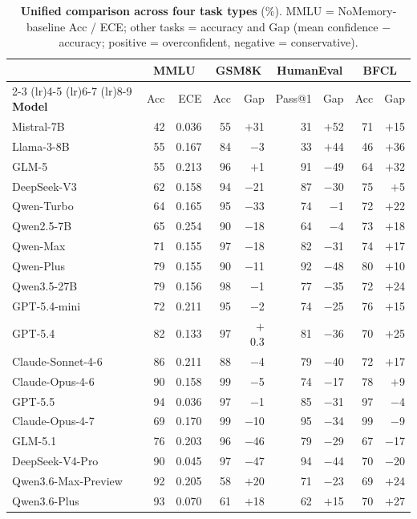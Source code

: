 \documentclass[11pt]{article}
\begin{document}
\begin{table}[h]
\centering
\caption{\textbf{Unified comparison across four task types} (\%). MMLU = NoMemory-baseline Acc / ECE; other tasks = accuracy and Gap (mean confidence $-$ accuracy; positive = overconfident, negative = conservative).}
\label{tab:fourtask_overview}
\small
\setlength{\tabcolsep}{4pt}
\begin{tabular}{l rr rr rr rr}
\toprule
& \multicolumn{2}{c}{\textbf{MMLU}} & \multicolumn{2}{c}{\textbf{GSM8K}} & \multicolumn{2}{c}{\textbf{HumanEval}} & \multicolumn{2}{c}{\textbf{BFCL}} \\
\cmidrule(lr){2-3} \cmidrule(lr){4-5} \cmidrule(lr){6-7} \cmidrule(lr){8-9}
\textbf{Model} & Acc & ECE & Acc & Gap & Pass@1 & Gap & Acc & Gap \\
\midrule
Mistral-7B        & 42 & 0.036 & 55 & $+$31 & 31 & $+$52 & 71 & $+$15 \\
Llama-3-8B        & 55 & 0.167 & 84 & $-$3  & 33 & $+$44 & 46 & $+$36 \\
GLM-5             & 55 & 0.213 & 96 & $+$1  & 91 & $-$49 & 64 & $+$32 \\
DeepSeek-V3     & 62 & 0.158 & 94 & $-$21 & 87 & $-$30 & 75 & $+$5  \\
Qwen-Turbo        & 64 & 0.165 & 95 & $-$33 & 74 & $-$1  & 72 & $+$22 \\
Qwen2.5-7B        & 65 & 0.254 & 90 & $-$18 & 64 & $-$4  & 73 & $+$18 \\
Qwen-Max          & 71 & 0.155 & 97 & $-$18 & 82 & $-$31 & 74 & $+$17 \\
Qwen-Plus         & 79 & 0.155 & 90 & $-$11 & 92 & $-$48 & 80 & $+$10 \\
Qwen3.5-27B       & 79 & 0.156 & 98 & $-$1  & 77 & $-$35 & 72 & $+$24 \\
\midrule
GPT-5.4-mini      & 72 & 0.211 & 95 & $-$2  & 74 & $-$25 & 76 & $+$15 \\
GPT-5.4           & 82 & 0.133 & 97 & $+$0.3 & 81 & $-$36 & 70 & $+$25 \\
Claude-Sonnet-4-6 & 86 & 0.211 & 88 & $-$4  & 79 & $-$40 & 72 & $+$17 \\
Claude-Opus-4-6   & 90 & 0.158 & 99 & $-$5  & 74 & $-$17 & 78 & $+$9  \\
GPT-5.5           & 94 & 0.036 & 97 & $-$1  & 85 & $-$31 & 97 & $-$4  \\
Claude-Opus-4-7   & 69 & 0.170 & 99 & $-$10 & 95 & $-$34 & 99 & $-$9  \\
\midrule
GLM-5.1                & 76 & 0.203 & 96 & $-$46 & 79 & $-$29 & 67 & $-$17 \\
DeepSeek-V4-Pro        & 90 & 0.045 & 97 & $-$47 & 94 & $-$44 & 70 & $-$20 \\
Qwen3.6-Max-Preview    & 92 & 0.205 & 58 & $+$20 & 71 & $-$23 & 69 & $+$24 \\
Qwen3.6-Plus           & 93 & 0.070 & 61 & $+$18 & 62 & $+$15 & 70 & $+$27 \\
\bottomrule
\end{tabular}
\end{table}
\end{document}
